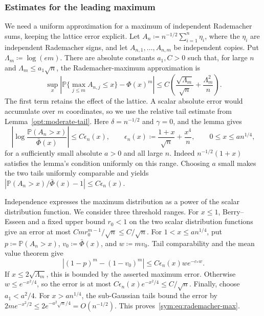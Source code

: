 \documentclass[11pt,letterpaper]{article}
\theoremstyle{remark}
\newcommand{\Pp}{\mathbb P}
\begin{document}
\subsubsection{Estimates for the leading maximum}

We need a uniform approximation for a maximum of independent
Rademacher sums, keeping the lattice error explicit. Let
\(A_n\coloneqq n^{-1/2}\sum_{i=1}^n\eta_i\), where the
\(\eta_i\) are independent Rademacher signs, and let
\(A_{n,1},\ldots,A_{n,m}\) be independent copies. Put
\(\Lambda_m\coloneqq\log(em)\). There are absolute constants
\(a_1,C>0\) such that, for large \(n\) and
\(\Lambda_m\le a_1\sqrt n\), the Rademacher-maximum approximation is
\begin{equation}
 \sup_x\left|\Pp\{\max_{j\le m}A_{n,j}\le x\}-\Phi(x)^m\right|
 \le C\left(\frac{\sqrt{\Lambda_m}}{\sqrt n}
                 +\frac{\Lambda_m^2}{n}\right).
 \label{sym:eq:rademacher-max}
\end{equation}
The first term retains the effect of the lattice. A scalar absolute
error would accumulate over \(m\) coordinates, so we use the relative
tail estimate from Lemma~\ref{opt:moderate-tail}. Here
\(\delta=n^{-1/2}\) and \(\gamma=0\), and the lemma gives
\[
 \left|\log\frac{\Pp(A_n>x)}{\bar\Phi(x)}\right|
 \le C\epsilon_n(x),\qquad
 \epsilon_n(x)\coloneqq\frac{1+x}{\sqrt n}+\frac{x^4}{n},
 \qquad 0\le x\le an^{1/4},
\]
for a sufficiently small absolute \(a>0\) and all large \(n\).
Indeed \(n^{-1/2}(1+x)\) satisfies the lemma's condition uniformly
on this range. Choosing \(a\) small makes the two tails uniformly
comparable and yields
\(\left|\Pp(A_n>x)/\bar\Phi(x)-1\right|\le C\epsilon_n(x)\).

Independence expresses the maximum distribution as a power of the
scalar distribution function. We consider three threshold ranges.
For \(x\le1\),
Berry--Esseen and a fixed upper bound \(r_0<1\) on the two scalar
distribution functions give an error at most
\(Cm r_0^{m-1}/\sqrt n\le C/\sqrt n\). For
\(1<x\le an^{1/4}\), put \(p\coloneqq\Pp(A_n>x)\),
\(v_0\coloneqq\bar\Phi(x)\), and \(w\coloneqq mv_0\).
Tail comparability and the mean value theorem give
\[
 |(1-p)^m-(1-v_0)^m|\le C\epsilon_n(x)w e^{-c_*w}.
\]
If \(x\le2\sqrt{\Lambda_m}\), this is bounded by the asserted
maximum error. Otherwise \(w\le e^{-x^2/4}\), so the error is
at most \(C\epsilon_n(x)e^{-x^2/4}\le C/\sqrt n\).
Finally, choose \(a_1<a^2/4\). For \(x>an^{1/4}\), the
sub-Gaussian tails bound the error by
\(2m e^{-x^2/2}\le2e^{-a^2\sqrt n/4}=O(n^{-1/2})\).
This proves~\eqref{sym:eq:rademacher-max}.
\end{document}
